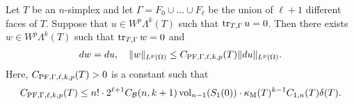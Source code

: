\documentclass[10pt,a4paper]{article}
\begin{document}
\begin{lemma}\label{lemma:mixedbconsimplex:exteriorderivative}
    Let $T$ be an $n$-simplex 
    and let $\Gamma = F_{0} \cup \dots \cup F_{\ell}$ be the union of $\ell+1$ different faces of $T$. 
    Suppose that $u \in W^{p}\Lambda^{k}(T)$ such that 
    $\operatorname{tr}_{T,\Gamma} u = 0$.
    Then there exists $w \in W^{p}\Lambda^{k}(T)$ such that 
    $\operatorname{tr}_{T,\Gamma} w = 0$
    and  
    \begin{align*}
        d w = d u,
        \quad 
        \| w \|_{L^{p}(\Omega)} 
        \leq 
        C_{{\rm PF},\Gamma,\ell,k,p}(T)
        \| d u \|_{L^{p}(\Omega)}
        .
    \end{align*}
    Here, $C_{{\rm PF},\Gamma,\ell,k,p}(T) > 0$ is a constant such that 
    \begin{align*}
        C_{{\rm PF},\Gamma,\ell,k,p}(T)
        \leq 
        n! \cdot 2^{\ell+1} 
        C_{{\mathcal B}}(n,k+1) 
        \operatorname{vol}_{n-1}(S_1(0))
        \cdot 
        \kappa_{\rm M}(T)^{k-1}
        C_{1,n}(T) 
        {\delta}(T)
        .
    \end{align*}
\end{lemma}
\end{document}
